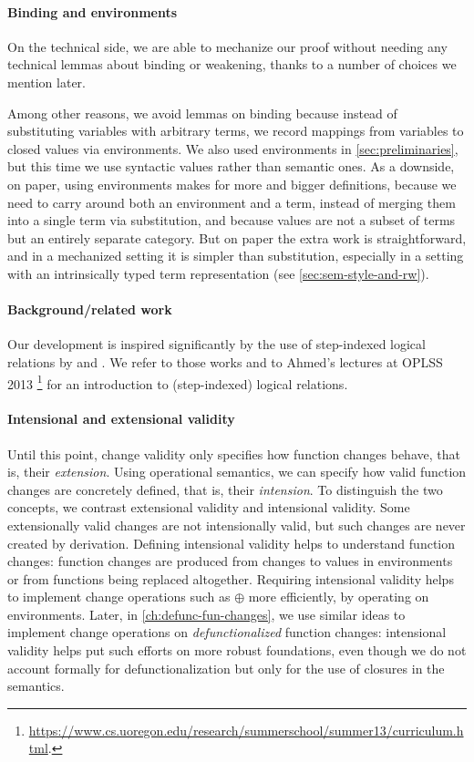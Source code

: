 \paragraph{Binding and environments}
On the technical side, we are able to mechanize our proof without
needing any technical lemmas about binding or weakening, thanks
to a number of choices we mention later.

Among other reasons, we avoid lemmas on binding because instead of substituting
variables with arbitrary terms, we record mappings from variables to closed
values via environments. We also used environments in \cref{sec:preliminaries},
but this time we use syntactic values rather than semantic ones.
As a downside, on paper, using environments makes for
more and bigger definitions, because we need to carry around both an environment
and a term, instead of merging them into a single term via substitution, and
because values are not a subset of terms but an entirely separate category.
But on paper the extra work is straightforward, and in a mechanized setting it
is simpler than substitution, especially in a setting with an intrinsically
typed term representation (see \cref{sec:sem-style-and-rw}).

\paragraph{Background/related work}
Our development is inspired significantly by the use of
step-indexed logical relations by \citet{Ahmed2006stepindexed}
and \citet*{Acar08}. We refer to
those works and to Ahmed's lectures at OPLSS 2013%
\footnote{\url{https://www.cs.uoregon.edu/research/summerschool/summer13/curriculum.html}.}
for an introduction to (step-indexed) logical relations.

\paragraph{Intensional and extensional validity}
Until this point, change validity only specifies how function
changes behave, that is, their \emph{extension}.
Using operational semantics, we can specify how valid function
changes are concretely defined, that is, their \emph{intension}.
To distinguish the two concepts, we contrast extensional validity
and intensional validity.
Some extensionally valid changes are not intensionally valid, but
such changes are never created by derivation.
Defining intensional validity helps to understand function
changes:
function changes are produced from changes to values in
environments or from functions being replaced altogether.
Requiring intensional validity helps to implement
change operations such as \ensuremath{\oplus } more efficiently, by
operating on environments.
Later, in \cref{ch:defunc-fun-changes},
we use similar ideas to implement change operations on
\emph{defunctionalized} function changes: intensional validity
helps put such efforts on more robust foundations, even though we
do not account formally for defunctionalization but only for
the use of closures in the semantics.

